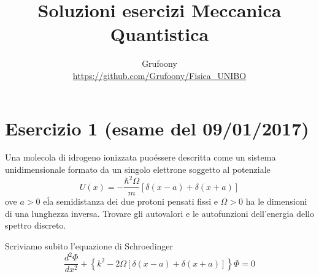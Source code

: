 \documentclass[a4paper]{article}
\begin{document}
	\title{Soluzioni esercizi Meccanica Quantistica}
	\author{Grufoony\\\url{https://github.com/Grufoony/Fisica_UNIBO}}
	\maketitle

    \section*{Esercizio 1 (esame del 09/01/2017)}
        Una molecola di idrogeno ionizzata puo\' essere descritta come un sistema unidimensionale formato da un singolo elettrone soggetto al potenziale
        \begin{equation*}
            U(x)=-\frac{\hbar^2\Omega}{m}\left[\delta(x-a)+\delta(x+a)\right]
        \end{equation*}
        ove $a>0$ e\' la semidistanza dei due protoni pensati fissi e $\Omega>0$ ha le dimensioni di una lunghezza inversa.
        Trovare gli autovalori e le autofunzioni dell'energia dello spettro discreto.
        \begin{figure}[H]
            \centering
        \end{figure}
        Scriviamo subito l'equazione di Schroedinger
        \begin{equation*}
            \frac{d^2\Phi}{dx^2}+\left\{k^2-2\Omega\left[\delta(x-a)+\delta(x+a)\right]\right\}\Phi=0
        \end{equation*}
\end{document}

